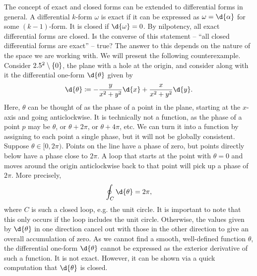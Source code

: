 \documentclass[a4paper,12pt]{article}
\begin{document}
The concept of exact and closed forms can be extended to differential forms in general.
A differential $k$-form $\omega$ is exact if it can be expressed as $\omega = \d{\alpha}$ for some $(k-1)$-form.
It is closed if $\d{\omega} = 0$.
By nilpotency, all exact differential forms are closed.
Is the converse of this statement -- ``all closed differential forms are exact'' -- true?
The answer to this depends on the nature of the space we are working with.
We will present the following counterexample.
Consider $2.5^2 \setminus \{0\}$, the plane with a hole at the origin, and consider along with it the differential one-form $\d{\theta}$ given by
\begin{equation*}
    \d{\theta} \coloneq -\frac{y}{x^2 + y^2} \d{x} + \frac{x}{x^2 + y^2} \d{y}.
\end{equation*}
Here, $\theta$ can be thought of as the phase of a point in the plane, starting at the $x$-axis and going anticlockwise.
It is technically not a function, as the phase of a point $p$ may be $\theta$, or $\theta + 2\pi$, or $\theta + 4\pi$, etc.
We can turn it into a function by assigning to each point a single phase, but it will not be globally consistent.
Suppose $\theta \in [0, 2\pi)$.
Points on the line have a phase of zero, but points directly below have a phase close to $2\pi$.
A loop that starts at the point with $\theta = 0$ and moves around the origin anticlockwise back to that point will pick up a phase of $2\pi$.
More precisely,
\begin{equation*}
    \oint_C \d{\theta} = 2\pi,
\end{equation*}
where $C$ is such a closed loop, e.g. the unit circle.
It is important to note that this only occurs if the loop includes the unit circle.
Otherwise, the values given by $\d{\theta}$ in one direction cancel out with those in the other direction to give an overall accumulation of zero.
As we cannot find a smooth, well-defined function $\theta$, the differential one-form $\d{\theta}$ cannot be expressed as the exterior derivative of such a function.
It is not exact.
However, it can be shown via a quick computation that $\d{\theta}$ is closed.
\end{document}
